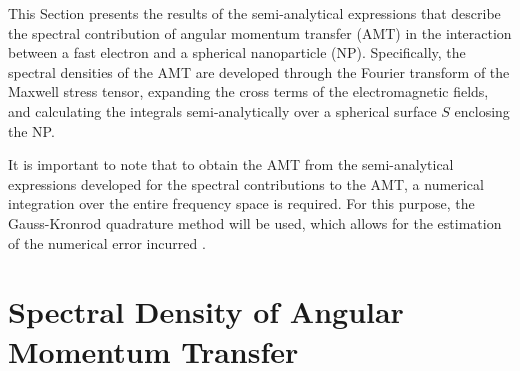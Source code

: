 \label{cap: resultados}

This Section presents the results of the semi-analytical expressions that describe the spectral contribution of angular momentum transfer (AMT) in the interaction between a fast electron and a spherical nanoparticle (NP). Specifically, the spectral densities of the AMT are developed through the Fourier transform of the Maxwell stress tensor, expanding the cross terms of the electromagnetic fields, and calculating the integrals semi-analytically over a spherical surface $S$ enclosing the NP.

It is important to note that to obtain the AMT from the semi-analytical expressions developed for the spectral contributions to the AMT, a numerical integration over the entire frequency space is required. For this purpose, the Gauss-Kronrod quadrature method will be used, which allows for the estimation of the numerical error incurred \cite{kahaner1989numerical}.

\vspace{-0.6 cm}

\section{Spectral Density of Angular Momentum Transfer}

